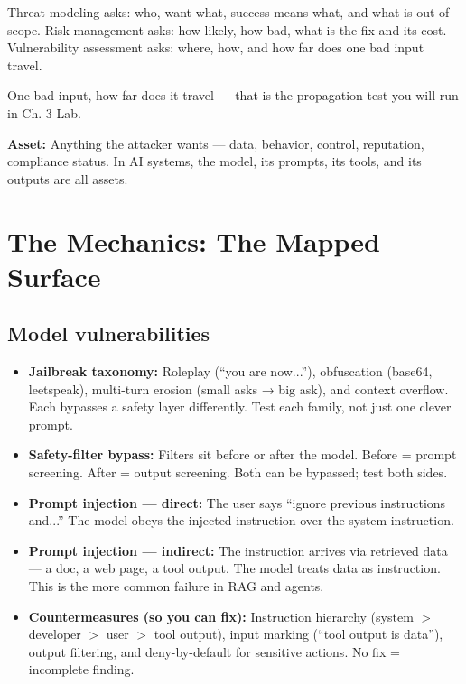 Threat modeling asks: who, want what, success means what, and what is out of scope. Risk management asks: how likely, how bad, what is the fix and its cost. Vulnerability assessment asks: where, how, and how far does one bad input travel.

One bad input, how far does it travel — that is the propagation test you will run in Ch. 3 Lab.

\begin{defbox}
\textbf{Asset:} Anything the attacker wants — data, behavior, control, reputation, compliance status. In AI systems, the model, its prompts, its tools, and its outputs are all assets.
\end{defbox}

\section{The Mechanics: The Mapped Surface}
\tierP

\subsection{Model vulnerabilities}
\begin{itemize}
\item \textbf{Jailbreak taxonomy:} Roleplay (``you are now...''), obfuscation (base64, leetspeak), multi-turn erosion (small asks → big ask), and context overflow. Each bypasses a safety layer differently. Test each family, not just one clever prompt.
\item \textbf{Safety-filter bypass:} Filters sit before or after the model. Before = prompt screening. After = output screening. Both can be bypassed; test both sides.
\item \textbf{Prompt injection — direct:} The user says ``ignore previous instructions and...'' The model obeys the injected instruction over the system instruction.
\item \textbf{Prompt injection — indirect:} The instruction arrives via retrieved data — a doc, a web page, a tool output. The model treats data as instruction. This is the more common failure in RAG and agents.
\item \textbf{Countermeasures (so you can fix):} Instruction hierarchy (system $>$ developer $>$ user $>$ tool output), input marking (``tool output is data''), output filtering, and deny-by-default for sensitive actions. No fix = incomplete finding.
\end{itemize}

